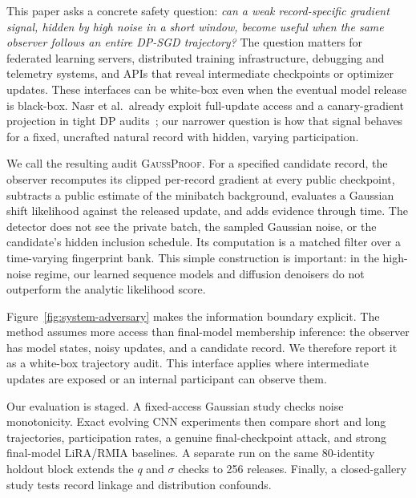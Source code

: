 \documentclass[conference]{IEEEtran}
\newcommand{\method}{\textsc{GaussProof}}
\begin{document}
This paper asks a concrete safety question: \emph{can a weak record-specific gradient signal, hidden by high noise in a short window, become useful when the same observer follows an entire DP-SGD trajectory?} The question matters for federated learning servers, distributed training infrastructure, debugging and telemetry systems, and APIs that reveal intermediate checkpoints or optimizer updates. These interfaces can be white-box even when the eventual model release is black-box. Nasr et al.\ already exploit full-update access and a canary-gradient projection in tight DP audits~\cite{nasr2023tight}; our narrower question is how that signal behaves for a fixed, uncrafted natural record with hidden, varying participation.

We call the resulting audit \method. For a specified candidate record, the observer recomputes its clipped per-record gradient at every public checkpoint, subtracts a public estimate of the minibatch background, evaluates a Gaussian shift likelihood against the released update, and adds evidence through time. The detector does not see the private batch, the sampled Gaussian noise, or the candidate's hidden inclusion schedule. Its computation is a matched filter over a time-varying fingerprint bank. This simple construction is important: in the high-noise regime, our learned sequence models and diffusion denoisers do not outperform the analytic likelihood score.

Figure~\ref{fig:system-adversary} makes the information boundary explicit. The method assumes more access than final-model membership inference: the observer has model states, noisy updates, and a candidate record. We therefore report it as a white-box trajectory audit. This interface applies where intermediate updates are exposed or an internal participant can observe them.

Our evaluation is staged. A fixed-access Gaussian study checks noise monotonicity. Exact evolving CNN experiments then compare short and long trajectories, participation rates, a genuine final-checkpoint attack, and strong final-model LiRA/RMIA baselines. A separate run on the same 80-identity holdout block extends the $q$ and $\sigma$ checks to 256 releases. Finally, a closed-gallery study tests record linkage and distribution confounds.
\end{document}
